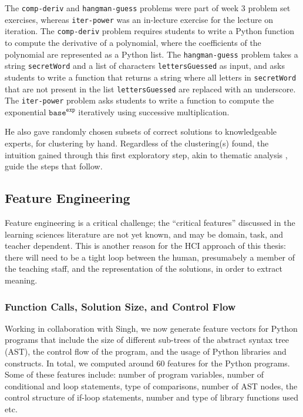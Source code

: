 \documentclass[12pt]{article}
\newcommand\codevar[1]{\texttt{#1}}
\begin{document}
The \codevar{comp-deriv} and \codevar{hangman-guess} problems were part of week 3 problem set exercises, whereas \codevar{iter-power} was an in-lecture exercise for the lecture on iteration. The \codevar{comp-deriv} problem requires students to write a Python function to compute the derivative of a polynomial, where the coefficients of the polynomial are represented as a Python list. The \codevar{hangman-guess} problem takes a string \codevar{secretWord} and a list of characters \codevar{lettersGuessed} as input, and asks students to write a function that returns a string where all letters in \codevar{secretWord} that are not present in the list \codevar{lettersGuessed} are replaced with an underscore. The \codevar{iter-power} problem asks students to write a function to compute the exponential $\codevar{base}^\codevar{exp}$ iteratively using successive multiplication.

He also gave randomly chosen subsets of correct solutions to knowledgeable experts, for clustering by hand. Regardless of the clustering(s) found, the intuition gained through this first exploratory step, akin to thematic analysis \cite{thematic06}, guide the steps that follow.

\subsection{Feature Engineering}

Feature engineering is a critical challenge; the ``critical features'' discussed in the learning sciences literature are not yet known, and may be domain, task, and teacher dependent. This is another reason for the HCI approach of this thesis: there will need to be a tight loop between the human, presumabely a member of the teaching staff, and the representation of the solutions, in order to extract meaning.



\subsubsection{Function Calls, Solution Size, and Control Flow}

Working in collaboration with Singh, we now generate feature vectors for Python programs that include the size of different sub-trees of the abstract syntax tree (AST), the control flow of the program, and the usage of Python libraries and constructs. In total, we computed around $60$ features for the Python programs. Some of these features include: number of program variables, number of conditional and loop statements, type of comparisons, number of AST nodes, the control structure of if-loop statements, number and type of library functions used etc.
\end{document}

